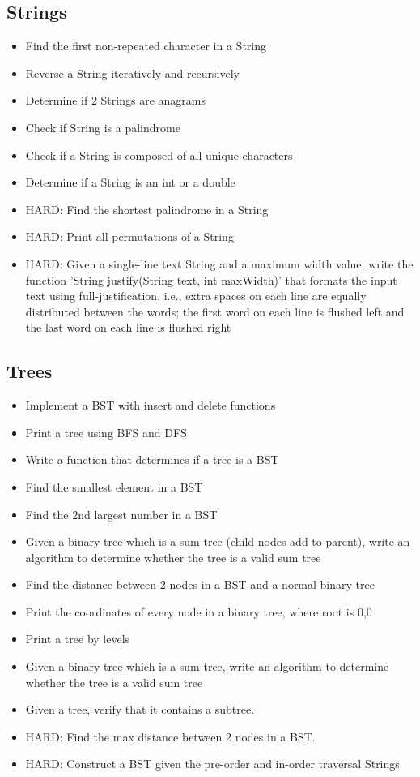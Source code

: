 \subsection{Strings}
\begin{itemize}
\item Find the first non-repeated character in a String
\item Reverse a String iteratively and recursively
\item Determine if 2 Strings are anagrams
\item Check if String is a palindrome
\item Check if a String is composed of all unique characters
\item Determine if a String is an int or a double
\item HARD: Find the shortest palindrome in a String
\item HARD: Print all permutations of a String
\item HARD: Given a single-line text String and a maximum width value, write the function 'String justify(String text, int maxWidth)' that formats the input text using full-justification, i.e., extra spaces on each line are equally distributed between the words; the first word on each line is flushed left and the last word on each line is flushed right
\end{itemize}
\subsection{Trees}
\begin{itemize}
\item Implement a BST with insert and delete functions
\item Print a tree using BFS and DFS
\item Write a function that determines if a tree is a BST
\item Find the smallest element in a BST
\item Find the 2nd largest number in a BST
\item Given a binary tree which is a sum tree (child nodes add to parent), write an algorithm to determine whether the tree is a valid sum tree
\item Find the distance between 2 nodes in a BST and a normal binary tree
\item Print the coordinates of every node in a binary tree, where root is 0,0
\item Print a tree by levels
\item Given a binary tree which is a sum tree, write an algorithm to determine whether the tree is a valid sum tree
\item Given a tree, verify that it contains a subtree.
\item HARD: Find the max distance between 2 nodes in a BST.
\item HARD: Construct a BST given the pre-order and in-order traversal Strings
\end{itemize}
